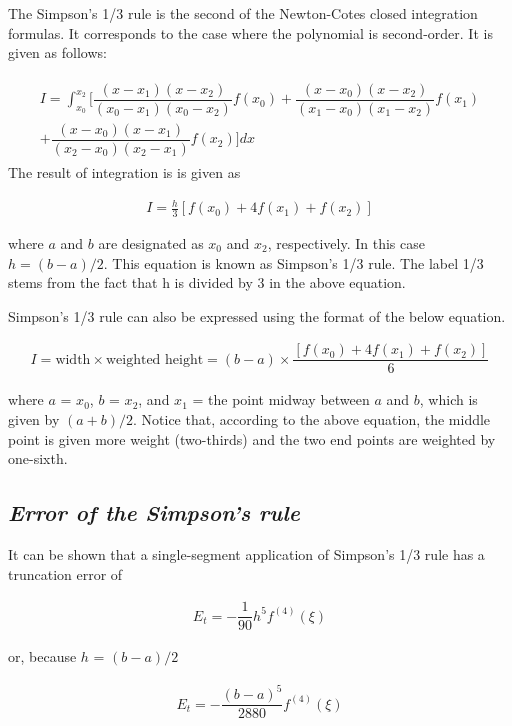 \documentclass[book.tex]{subfiles}
\begin{document}
The Simpson's 1/3 rule is the second of the Newton-Cotes closed integration formulas. It corresponds to the case where the polynomial is second-order. It is given as follows:

\begin{align}
\begin{split}
I = \int_{x_0}^{x_2} [\dfrac{(x-x_1)(x-x_2)}{(x_0-x_1)(x_0-x_2)}f(x_0) + \dfrac{(x-x_0)(x-x_2)}{(x_1-x_0)(x_1-x_2)}f(x_1) \\
+ \dfrac{(x-x_0)(x-x_1)}{(x_2-x_0)(x_2-x_1)}f(x_2)] dx
\end{split}
\end{align}
The result of integration is is given as

\begin{align}
I = \frac{h}{3}[f(x_0) + 4f(x_1) + f(x_2)]
\end{align}

where $a$ and $b$ are designated as $x_0$ and $x_2$, respectively. In this case $h = (b-a)/2$. This equation is known as Simpson's 1/3 rule. The label 1/3 stems from the fact that h is divided by 3 in the above equation.

Simpson's 1/3 rule can also be expressed using the format of the below equation.

\begin{align}
I =\text{width} \times \text{weighted height} = (b-a) \times \dfrac{[f(x_0)+4f(x_1)+f(x_2)]}{6}
\end{align}

where $a$ = $x_0$, $b$ = $x_2$, and $x_1$ = the point midway between $a$ and $b$, which is given by $(a + b)/2$. Notice that, according to the above equation, the middle point is given more weight (two-thirds) and the two end points are weighted by one-sixth.

\subsection{\textit{Error of the Simpson's rule}}

It can be shown that a single-segment application of Simpson's 1/3 rule has a truncation error of

\begin{align}
E_t = -\dfrac{1}{90}h^5f^{(4)}(\xi)
\end{align}

or, because $h$ = $(b-a)/2$

\begin{align}
E_t = -\dfrac{(b-a)^5}{2880}f^{(4)}(\xi)
\end{align}
\end{document}
